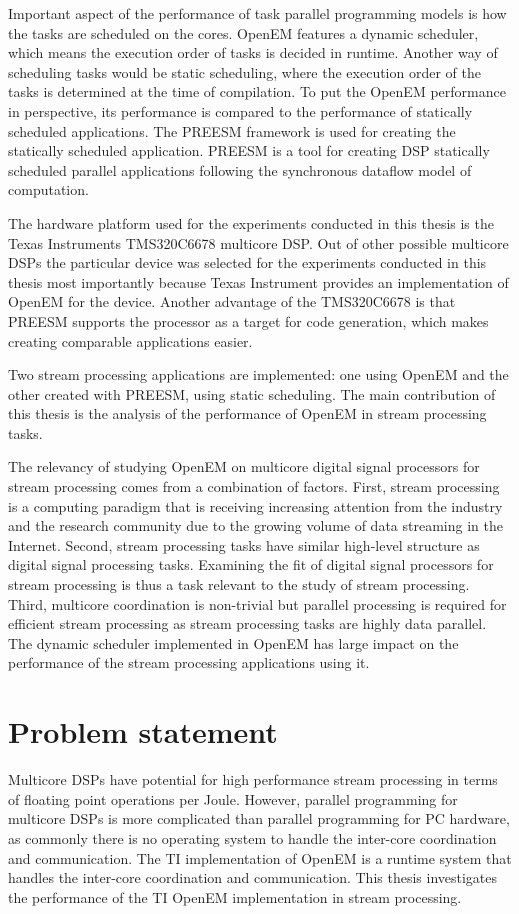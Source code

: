 Important aspect of the performance of task parallel programming models is how the tasks are scheduled on the cores. OpenEM features a dynamic scheduler, which means the execution order of tasks is decided in runtime. Another way of scheduling tasks would be static scheduling, where the execution order of the tasks is determined at the time of compilation. To put the OpenEM performance in perspective, its performance is compared to the performance of statically scheduled applications. The PREESM framework is used for creating the statically scheduled application. PREESM is a tool for creating DSP statically scheduled parallel applications following the synchronous dataflow model of computation.

The hardware platform used for the experiments conducted in this thesis is the Texas Instruments TMS320C6678 multicore DSP. Out of other possible multicore DSPs the particular device was selected for the experiments conducted in this thesis most importantly because Texas Instrument provides an implementation of OpenEM for the device. Another advantage of the TMS320C6678 is that PREESM supports the processor as a target for code generation, which makes creating comparable applications easier.

Two stream processing applications are implemented: one using OpenEM and the other created with PREESM, using static scheduling. The main contribution of this thesis is the analysis of the performance of OpenEM in stream processing tasks.

The relevancy of studying OpenEM on multicore digital signal processors for stream processing comes from a combination of factors. First, stream processing is a computing paradigm that is receiving increasing attention from the industry and the research community due to the growing volume of data streaming in the Internet. Second, stream processing tasks have similar high-level structure as digital signal processing tasks. Examining the fit of digital signal processors for stream processing is thus a task relevant to the study of stream processing. Third, multicore coordination is non-trivial but parallel processing is required for efficient stream processing as stream processing tasks are highly data parallel. The dynamic scheduler implemented in OpenEM has large impact on the performance of the stream processing applications using it.

\section{Problem statement}
\label{section:problem-statement}
Multicore DSPs have potential for high performance stream processing in terms of floating point operations per Joule. However, parallel programming for multicore DSPs is more complicated than parallel programming for PC hardware, as commonly there is no operating system to handle the inter-core coordination and communication. The TI implementation of OpenEM is a runtime system that handles the inter-core coordination and communication. This thesis investigates the performance of the TI OpenEM implementation in stream processing.

